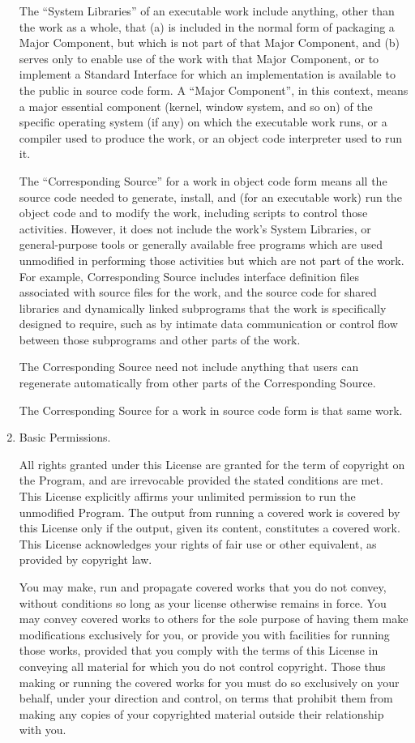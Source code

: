 \documentclass[11pt,twoside,fleqn,openright,titlepage]{cslreport}
\begin{document}
\begin{small}
\begin{enumerate}
The ``System Libraries'' of an executable work include anything, other
than the work as a whole, that (a) is included in the normal form of
packaging a Major Component, but which is not part of that Major
Component, and (b) serves only to enable use of the work with that
Major Component, or to implement a Standard Interface for which an
implementation is available to the public in source code form.  A
``Major Component'', in this context, means a major essential component
(kernel, window system, and so on) of the specific operating system
(if any) on which the executable work runs, or a compiler used to
produce the work, or an object code interpreter used to run it.

The ``Corresponding Source'' for a work in object code form means all
the source code needed to generate, install, and (for an executable
work) run the object code and to modify the work, including scripts to
control those activities.  However, it does not include the work's
System Libraries, or general-purpose tools or generally available free
programs which are used unmodified in performing those activities but
which are not part of the work.  For example, Corresponding Source
includes interface definition files associated with source files for
the work, and the source code for shared libraries and dynamically
linked subprograms that the work is specifically designed to require,
such as by intimate data communication or control flow between those
subprograms and other parts of the work.

The Corresponding Source need not include anything that users
can regenerate automatically from other parts of the Corresponding
Source.

The Corresponding Source for a work in source code form is that
same work.

\item Basic Permissions.

All rights granted under this License are granted for the term of
copyright on the Program, and are irrevocable provided the stated
conditions are met.  This License explicitly affirms your unlimited
permission to run the unmodified Program.  The output from running a
covered work is covered by this License only if the output, given its
content, constitutes a covered work.  This License acknowledges your
rights of fair use or other equivalent, as provided by copyright law.

You may make, run and propagate covered works that you do not
convey, without conditions so long as your license otherwise remains
in force.  You may convey covered works to others for the sole purpose
of having them make modifications exclusively for you, or provide you
with facilities for running those works, provided that you comply with
the terms of this License in conveying all material for which you do
not control copyright.  Those thus making or running the covered works
for you must do so exclusively on your behalf, under your direction
and control, on terms that prohibit them from making any copies of
your copyrighted material outside their relationship with you.


\end{enumerate}
\end{small}
\end{document}

